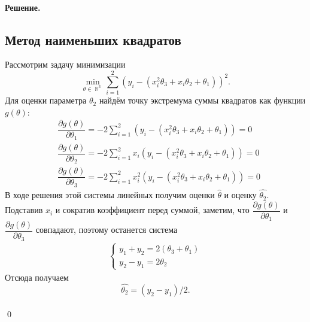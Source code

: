 \documentclass[specialist, subf, href, 12pt]{article}
\DeclareMathOperator\R{\mathbb{R}}
\newenvironment{solution}{\paragraph{Решение.}}{\hfill\\\hfill\qed}
\begin{document}
\begin{solution}
		\subsection{Метод наименьших квадратов}
		Рассмотрим задачу минимизации
		\begin{equation*}
			\min_{\theta\in\R^3}\sum_{i=1}^2(y_i-(x_i^2\theta_3 + x_i\theta_2 + \theta_1))^2.
		\end{equation*}
		Для оценки параметра $\theta_2$ найдём точку экстремума суммы квадратов как функции $g(\theta)$:
		\begin{align*}
			&\dfrac{\partial g(\theta)}{\partial\theta_1} = -2\sum_{i=1}^2(y_i-(x_i^2\theta_3 + x_i\theta_2 + \theta_1))=0\\
			&\dfrac{\partial g(\theta)}{\partial\theta_2} = -2\sum_{i=1}^2x_i(y_i-(x_i^2\theta_3 + x_i\theta_2 + \theta_1))=0\\
			&\dfrac{\partial g(\theta)}{\partial\theta_3} = -2\sum_{i=1}^2x_i^2(y_i-(x_i^2\theta_3 + x_i\theta_2 + \theta_1))=0
		\end{align*} 
		В ходе решения этой системы линейных получим оценки $\widehat{\theta}$ и оценку $\widehat{\theta_2}$. Подставив $x_i$ и сократив коэффициент перед суммой, заметим, что $\dfrac{\partial g(\theta)}{\partial\theta_1}$ и $\dfrac{\partial g(\theta)}{\partial\theta_3}$ совпадают, поэтому останется система
		\begin{align*}
			\begin{cases}
				y_1+y_2=2(\theta_3 + \theta_1)\\
				y_2-y_1=2\theta_2
			\end{cases}
		\end{align*}
		Отсюда получаем
		\begin{equation*}
			\widehat{\theta_2} = (y_2-y_1)/2.
		\end{equation*}
	\end{solution}
\end{document}
